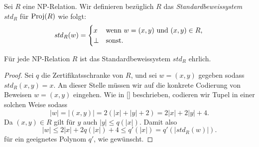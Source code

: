 \begin{definition}[Standardbeweissystem]
    Sei $R$ eine NP-Relation. Wir definieren bezüglich $R$ das \emph{Standardbeweissystem} $\mathit{std}_R$ für $\operatorname{Proj}(R)$ wie folgt:
    \[ \mathit{std}_R(w) = \begin{cases} x & \text{wenn $w=(x,y)$ und $(x,y)\in R$,}\\
    \bot & \text{sonst}.\end{cases} \qedhere \] 
\end{definition}
\begin{observation}\label{obs:spps-honest}
    Für jede NP-Relation $R$ ist das Standardbeweissystem $\mathit{std}_R$ ehrlich.
\end{observation}
\begin{proof}
    Sei $q$ die Zertifikatsschranke von $R$, und sei $w=(x,y)$ gegeben sodass $\mathit{std}_R(x,y) = x$.
    An dieser Stelle müssen wir auf die konkrete Codierung von Beweisen $w=(x,y)$ eingehen.
    Wie in \ref{} beschrieben, codieren wir Tupel in einer solchen Weise sodass
    \[ |w| = |(x,y)| = 2(|x|+|y|+2) = 2|x|+ 2|y| + 4. \]
    Da $(x,y)\in R$ gilt für $y$ auch $|y|\leq q(|x|)$.
    Damit also
    \[ |w| \leq 2|x|+ 2q(|x|) + 4 \leq q'(|x|) = q'(|\mathit{std}_R(w)|). \]
    für ein geeignetes Polynom $q'$, wie gewünscht.
\end{proof}

